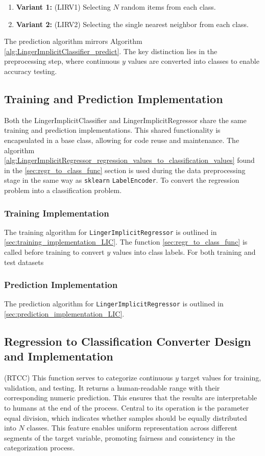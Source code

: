 \documentclass[a4paper, 12pt]{report}
\begin{document}
\begin{enumerate}
\item \textbf{Variant 1:} (LIRV1) Selecting $N$ random items from each class.
\item \textbf{Variant 2:} (LIRV2) Selecting the single nearest neighbor from each class.
\end{enumerate}

The prediction algorithm mirrors Algorithm \ref{alg:LingerImplicitClassifier_predict}. 
The key distinction lies in the preprocessing step, where continuous $y$ values are 
converted into classes to enable accuracy testing.

\subsection{Training and Prediction Implementation}
Both the LingerImplicitClassifier and LingerImplicitRegressor share the same training and prediction implementations. 
This shared functionality is encapsulated in a base class, allowing for code reuse and maintenance. The algorithm \ref{alg:LingerImplicitRegressor_regression_values_to_classification_values} found in the 
\ref{sec:regr_to_class_func} section is used during the data preprocessing stage in the same way as \texttt{sklearn} \texttt{LabelEncoder}. 
To convert the regression problem into a classification problem.

\subsubsection{Training Implementation}
The training algorithm for \texttt{LingerImplicitRegressor} is outlined in \ref{sec:training_implementation_LIC}.
The function \ref{sec:regr_to_class_func} is called before training to convert $y$ values into class labels. For both training and test datasets

\subsubsection{Prediction Implementation}
The prediction algorithm for \texttt{LingerImplicitRegressor} is outlined in \ref{sec:prediction_implementation_LIC}.

\subsection{Regression to Classification Converter Design and Implementation} (RTCC)
\label{sec:regr_to_class_func}
This function serves to categorize continuous $y$ target values for training, validation, and testing. 
It returns a human-readable range with their corresponding numeric prediction.
This ensures that the results are interpretable to humans at the end of the process.
Central to its operation is the parameter $\text{equal division}$, which indicates whether samples should be equally distributed into $N$ 
classes. This feature enables uniform representation across different segments of the target variable, promoting fairness and consistency 
in the categorization process.
\end{document}
